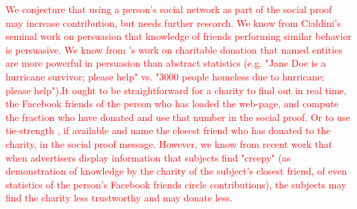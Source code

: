 \begin{description} [leftmargin=\parindent,topsep=0pt,partopsep=3pt,parsep=0pt,itemsep=3pt, listparindent=\parindent]
    \textcolor{red}{We conjecture that using a person's social network as part of the social proof may increase contribution, but needs further research. We know from Cialdini's seminal work on persuasion that knowledge of friends performing similar behavior is persuasive. We know from \textcite{small2007sympathy}'s work on charitable donation that named entities are more powerful in persuasion than abstract statistics (e.g. "Jane Doe is a hurricane survivor; please help" vs. "3000 people homeless due to hurricane; please help").It ought to be straightforward for a charity to find out in real time, the Facebook friends of the person who has loaded the web-page, and compute the fraction who have donated and use that number in the social proof. Or to use tie-strength \cite{Gilbert}, if available and name the closest friend who has donated to the charity, in the social proof message. However, we know from recent work \cite{eslami2018communicating} that when advertisers display information that subjects find "creepy" (as demonstration of knowledge by the charity of the subject's closest friend, of even statistics of the person's Facebook friends circle contributions), the subjects may find the charity less trustworthy and may donate less.}
    

\end{description}
